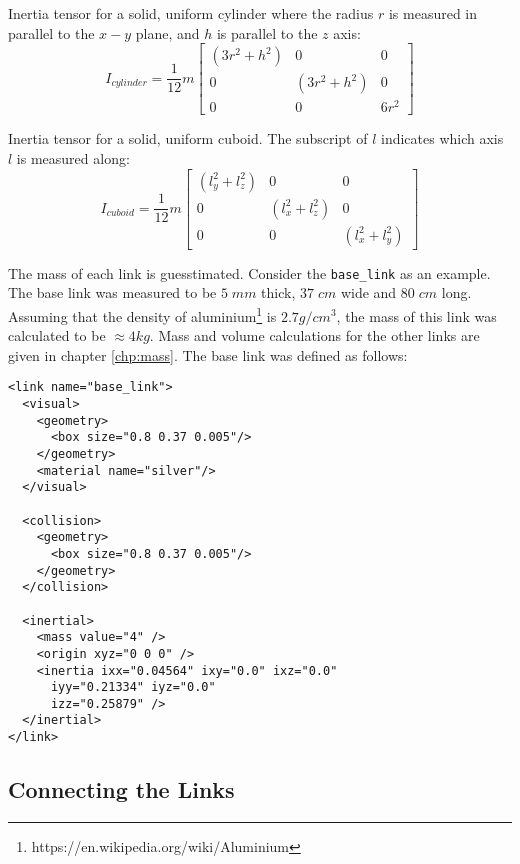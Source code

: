 Inertia tensor for a solid, uniform cylinder where the radius $r$ is measured in parallel to the $x - y$ plane, and $h$ is parallel to the $z$ axis:
\begin{equation}
I_{cylinder} = \frac{1}{12}m \begin{bmatrix}
	(3 r^2 + h^2) & 0 & 0 \\[0.3em]
	0 & (3 r^2 + h^2) & 0 \\[0.3em]
	0 & 0 & 6r^2
	\end{bmatrix}
	\label{eq:cylinder}
\end{equation}

Inertia tensor for a solid, uniform cuboid. The subscript of $l$ indicates which axis $l$ is measured along:
\begin{equation}
I_{cuboid} = \frac{1}{12}m \begin{bmatrix}
	(l_y^2 + l_z^2) & 0 & 0 \\[0.3em]
	0 & (l_x^2 + l_z^2) & 0 \\[0.3em]
	0 & 0 & (l_x^2 + l_y^2)
\end{bmatrix}
\label{eq:cuboid}
\end{equation}

The mass of each link is guesstimated. Consider the \texttt{base\_link} as an example. The base link was measured to be $5 \; mm$ thick, $37 \; cm$ wide and $80 \; cm$ long. Assuming that the density of aluminium\footnote{https://en.wikipedia.org/wiki/Aluminium} is $2.7 g/cm^3$, the mass of this link was calculated to be $\approx 4 kg$. Mass and volume calculations for the other links are given in chapter \ref{chp:mass}. The base link was defined as follows:

\newpage

\lstset{language=XML}
\begin{lstlisting}
<link name="base_link">
  <visual>
    <geometry>
      <box size="0.8 0.37 0.005"/>
    </geometry>
    <material name="silver"/>
  </visual>
	  
  <collision>
    <geometry>
      <box size="0.8 0.37 0.005"/>
    </geometry>
  </collision>
	  
  <inertial>
    <mass value="4" />
    <origin xyz="0 0 0" />
    <inertia ixx="0.04564" ixy="0.0" ixz="0.0"
      iyy="0.21334" iyz="0.0" 
      izz="0.25879" />
  </inertial>
</link>
\end{lstlisting}



\subsection{Connecting the Links}

